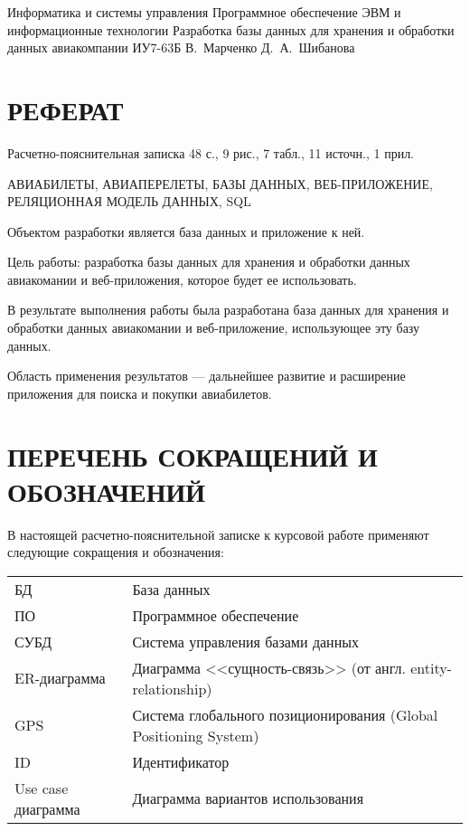 \documentclass{bmstu}
\begin{document}
\makecourseworktitle
    {Информатика и системы управления}
    {Программное обеспечение ЭВМ и информационные технологии}
    {Разработка базы данных для хранения и обработки данных авиакомпании}
    {ИУ7-63Б}
    {В.~Марченко}
    {Д.~А.~Шибанова}
    {}
    {}
    
\setcounter{page}{3}

{\centering \chapter*{РЕФЕРАТ}}

Расчетно-пояснительная записка 48 с., 9 рис., 7 табл., 11 источн., 1 прил.

\noindent АВИАБИЛЕТЫ, АВИАПЕРЕЛЕТЫ, БАЗЫ ДАННЫХ, ВЕБ-ПРИЛОЖЕНИЕ, РЕЛЯЦИОННАЯ МОДЕЛЬ ДАННЫХ, SQL

Объектом разработки является база данных и приложение к ней.

Цель работы: разработка базы данных для хранения и обработки данных авиакомании и веб-приложения, которое будет ее использовать.

В результате выполнения работы была разработана база данных для хранения и обработки данных авиакомании и веб-приложение, использующее эту базу данных.

Область применения результатов --- дальнейшее развитие и расширение приложения для поиска и покупки авиабилетов.
    
\maketableofcontents

{\centering \chapter*{ПЕРЕЧЕНЬ СОКРАЩЕНИЙ И ОБОЗНАЧЕНИЙ}}

В настоящей расчетно-пояснительной записке к курсовой работе применяют следующие сокращения и обозначения:

\begin{table}[H]
\begin{tabular}{p{5cm}p{10.5cm}}
БД & База данных
\tabularnewline
ПО & Программное обеспечение
\tabularnewline
СУБД & Система управления базами данных
\tabularnewline
ER-диаграмма & Диаграмма <<сущность-связь>> (от англ. entity-relationship)
\tabularnewline
GPS & Система глобального позиционирования (Global Positioning System)
\tabularnewline
ID & Идентификатор
\tabularnewline
Use case диаграмма & Диаграмма вариантов использования
\tabularnewline
\end{tabular}
\end{table}
\end{document}
